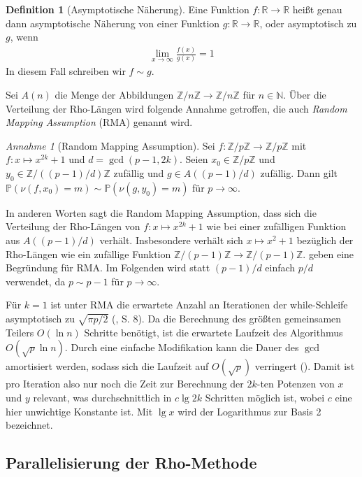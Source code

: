 \documentclass[a4paper, 11pt, ngerman]{article}
\newcommand{\N}{\mathbb{N}}
\newcommand{\R}{\mathbb{R}}
\newcommand{\Z}{\mathbb{Z}}
\renewcommand{\P}{\mathbb{P}}
\theoremstyle{definition}
\newtheorem{definition}{Definition}
\theoremstyle{plain}
\theoremstyle{remark}
\newtheorem*{assumption*}{Annahme}
\begin{document}
\begin{definition}[Asymptotische Näherung]
    Eine Funktion $f : \R \to \R$ heißt genau dann asymptotische Näherung von einer Funktion $g : \R \to \R$, oder asymptotisch zu $g$, wenn
    \begin{align*}
        \lim_{x \to \infty} \frac {f(x)} {g(x)} = 1
    \end{align*}
    In diesem Fall schreiben wir $f \sim g$.
\end{definition}

\noindent Sei $A(n)$ die Menge der Abbildungen $\Z/n\Z \to \Z/n\Z$ für $n \in \N$. Über die Verteilung der Rho-Längen wird folgende Annahme getroffen, die auch \emph{Random Mapping Assumption} (RMA) genannt wird.

\begin{assumption*}[Random Mapping Assumption]
    Sei $f: \Z/p\Z \to \Z/p\Z$ mit $f : x \mapsto x^{2k} + 1$ und $d = \gcd(p - 1, 2k)$. Seien $x_0 \in \Z/p\Z$ und $y_0 \in \Z/((p - 1)/d)\Z$ zufällig und $g \in A((p - 1)/d)$ zufällig. Dann gilt $\P(\nu(f, x_0) = m) \sim \P(\nu(g, y_0) = m)$ für $p \to \infty$.
\end{assumption*}

\noindent In anderen Worten sagt die Random Mapping Assumption, dass sich die Verteilung der Rho-Längen von $f : x \mapsto x^{2k} + 1$ wie bei einer zufälligen Funktion aus $A((p - 1)/d)$ verhält. Insbesondere verhält sich $x \mapsto x^2 + 1$ bezüglich der Rho-Längen wie ein zufällige Funktion $\Z/(p - 1)\Z \to \Z/(p - 1)\Z$. \cite{bp81} geben eine Begründung für RMA. Im Folgenden wird statt $(p - 1)/d$ einfach $p/d$ verwendet, da $p \sim p - 1$ für $p \to \infty$.

Für $k = 1$ ist unter RMA die erwartete Anzahl an Iterationen der while-Schleife asymptotisch zu $\sqrt{\pi p / 2}$ (\cite{knu98}, S. 8). Da die Berechnung des größten gemeinsamen Teilers $O(\ln n)$ Schritte benötigt, ist die erwartete Laufzeit des Algorithmus $O(\sqrt p \ln n)$. Durch eine einfache Modifikation kann die Dauer des $\gcd$ amortisiert werden, sodass sich die Laufzeit auf $O(\sqrt p)$ verringert (\cite{bre80}). Damit ist pro Iteration also nur noch die Zeit zur Berechnung der $2k$-ten Potenzen von $x$ und $y$ relevant, was durchschnittlich in $c \lg 2k$ Schritten möglich ist, wobei $c$ eine hier unwichtige Konstante ist. Mit $\lg x$ wird der Logarithmus zur Basis 2 bezeichnet.

\subsection{Parallelisierung der Rho-Methode}
\end{document}
